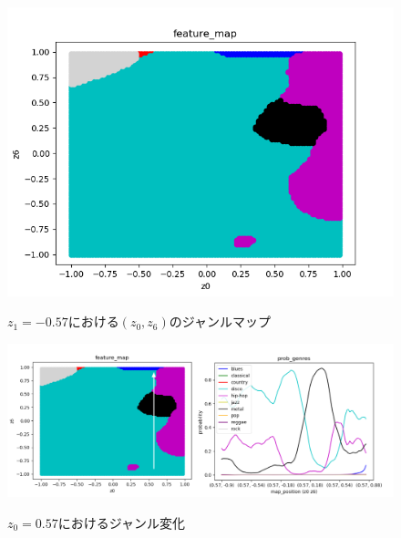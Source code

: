 \begin{figure}[htbp]
	\begin{center}
		\includegraphics[scale=0.8]{./images/visualize/map6.png}
		\caption{$z_1=-0.57$における$(z_0, z_6)$のジャンルマップ}
		\label{fig:featmap6}
		\vspace{40pt}
		\includegraphics[scale=0.7]{./images/visualize/trans2.png}
		\caption{$z_0=0.57$におけるジャンル変化}
		\label{fig:trans2}
	\end{center}
\end{figure}
